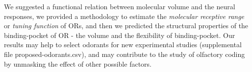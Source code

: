 \documentclass[11pt]{paper} %
\begin{document}
We suggested a functional relation between molecular volume and the neural responses, 
we provided a methodology to estimate the {\it molecular receptive range} or {\it tuning function} of ORs,
and then we predicted the structural properties of the binding-pocket of OR - the volume and the flexibility of binding-pocket.
Our results may help to select odorants  for new experimental studies (supplemental file proposed-odorants.csv), 
and may contribute to the study of olfactory coding by unmasking the effect of other possible factors.














 
\end{document}
